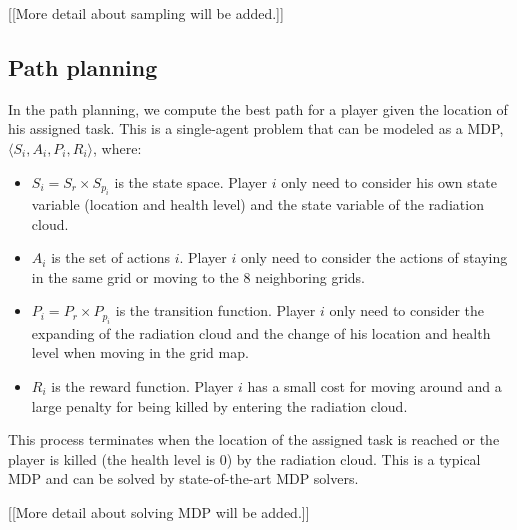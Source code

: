 [[More detail about sampling will be added.]]

\subsection{Path planning}

In the path planning, we compute the best path for a player given
the location of his assigned task. This is a single-agent problem
that can be modeled as a MDP, $\langle S_i, A_i, P_i, R_i \rangle$,
where:
\begin{itemize}
  \item $S_i = S_r \times S_{p_i}$ is the state space. Player
      $i$ only need to consider his own state variable
      (location and health level) and the state variable of the
      radiation cloud.
  \item $A_i$ is the set of actions $i$. Player $i$ only need
      to consider the actions of staying in the same grid or
      moving to the 8 neighboring grids.
  \item $P_i = P_r \times P_{p_i}$ is the transition function.
      Player $i$ only need to consider the expanding of the
      radiation cloud and the change of his location and health
      level when moving in the grid map.
  \item $R_i$ is the reward function. Player $i$ has a small
      cost for moving around and a large penalty for being
      killed by entering the radiation cloud.
\end{itemize}
This process terminates when the location of the assigned task is
reached or the player is killed (the health level is 0) by the
radiation cloud. This is a typical MDP and can be solved by
state-of-the-art MDP solvers.

[[More detail about solving MDP will be added.]]
